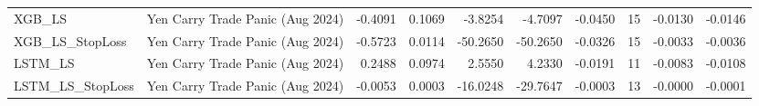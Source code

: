 \begin{tabular}{llrrrrrrrr}
\cline{1-10}
XGB\_LS & Yen Carry Trade Panic (Aug 2024) & -0.4091 & 0.1069 & -3.8254 & -4.7097 & -0.0450 & 15 & -0.0130 & -0.0146 \\
\cline{1-10}
XGB\_LS\_StopLoss & Yen Carry Trade Panic (Aug 2024) & -0.5723 & 0.0114 & -50.2650 & -50.2650 & -0.0326 & 15 & -0.0033 & -0.0036 \\
\cline{1-10}
LSTM\_LS & Yen Carry Trade Panic (Aug 2024) & 0.2488 & 0.0974 & 2.5550 & 4.2330 & -0.0191 & 11 & -0.0083 & -0.0108 \\
\cline{1-10}
LSTM\_LS\_StopLoss & Yen Carry Trade Panic (Aug 2024) & -0.0053 & 0.0003 & -16.0248 & -29.7647 & -0.0003 & 13 & -0.0000 & -0.0001 \\
\cline{1-10}
\bottomrule
\end{tabular}
